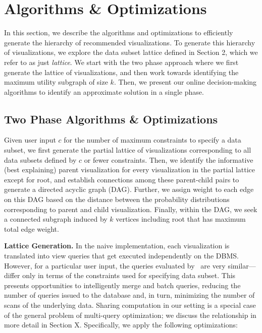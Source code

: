 


\section{Algorithms \& Optimizations}
In this section, we describe the algorithms and optimizations to efficiently generate the hierarchy of recommended visualizations. To generate this hierarchy of visualizations, we explore the data subset lattice defined in Section 2, which we refer to as just \emph{lattice}. We start with the two phase approach where we first generate the lattice of visualizations, and then work towards identifying the maximum utility subgraph of size $k$. Then, we present our online decision-making algorithms to identify an approximate solution in a single phase. 


\subsection{Two Phase Algorithms \& Optimizations}
Given user input $c$ for the number of maximum constraints to specify a data subset, we first generate the partial lattice of visualizations corresponding to all data subsets defined by $c$ or fewer constraints. Then, we identify the informative (best explaining) parent visualization for every visualization in the partial lattice except for root, and establish connections among these parent-child pairs to generate a directed acyclic graph (DAG). Further, we assign weight to each edge on this DAG based on the distance between the probability distributions corresponding to parent and child visualization. Finally, within the DAG, we seek a connected subgraph induced by $k$ vertices including root that has maximum total edge weight. 

\textbf{Lattice Generation.} In the naive implementation, each visualization is translated into view queries that get executed independently on the DBMS. However, for a particular user input, the queries evaluated by \system\ are very similar--- differ only in terms of the constraints used for specifying data subset. This presents opportunities to intelligently merge and batch queries, reducing the number of queries issued to the database and, in turn, minimizing the number of scans of the underlying data. Sharing computation in our setting is a special case of the general problem of multi-query optimization; we discuss the relationship in more detail in Section X. Specifically, we apply the following optimizations:

